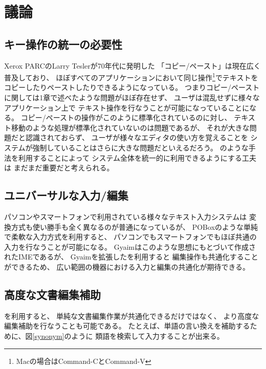 \section{議論}

\subsection{キー操作の統一の必要性}

Xerox PARCのLarry Teslerが70年代に発明した\cite{Tesler:CopyPaste}
「コピー/ペースト」は現在広く普及しており、
ほぼすべてのアプリケーションにおいて同じ操作\footnote{
  Macの場合はCommand-CとCommand-V
}でテキストをコピーしたりペーストしたりできるようになっている。
つまりコピー/ペーストに関しては1章で述べたような問題がほぼ存在せず、
ユーザは混乱せずに様々なアプリケーション上で
テキスト操作を行なうことが可能になっていることになる。
コピー/ペーストの操作がこのように標準化されているのに対し、
テキスト移動のような処理が標準化されていないのは問題であるが、
それが大きな問題だと認識されておらず、
ユーザが様々なエディタの使い方を覚えることを
システムが強制していることはさらに大きな問題だといえるだろう。
{\system}のような手法を利用することによって
システム全体を統一的に利用できるようにする工夫は
まだまだ重要だと考えられる。

\subsection{ユニバーサルな入力/編集}

パソコンやスマートフォンで利用されている様々なテキスト入力システムは
変換方式も使い勝手も全く異なるのが普通になっているが、
POBox\cite{Masui:POBox}のような単純で柔軟な入力方式を利用すると、
パソコンでもスマートフォンでもほぼ共通の入力を行なうことが可能になる。
Gyaimはこのような思想にもとづいて作成されたIMEであるが、
Gyaimを拡張した{\system}を利用すると
編集操作も共通化することができるため、
広い範囲の機器における入力と編集の共通化が期待できる。

\subsection{高度な文書編集補助}

{\system}を利用すると、
単純な文書編集作業が共通化できるだけではなく、
より高度な編集補助を行なうことも可能である。
たとえば、単語の言い換えを補助するために、図\ref{synonym}のように
類語を検索して入力することが出来る。

